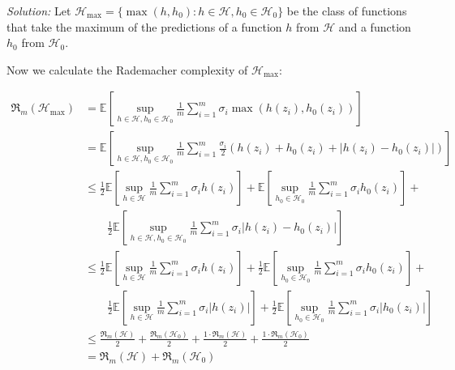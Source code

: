\documentclass[
	10pt, %
	a4paper, %
	oneside, %
	headinclude,footinclude, %
	BCOR5mm, %
]{scrartcl}
\newenvironment{solution}
{\textit{Solution:}}
{}
\begin{document}
\begin{solution}
	Let $\mathcal{H}_{\max} = \{\max(h, h_0 ): h \in \mathcal{H}, h_0 \in \mathcal{H_0} \}$ be the class of functions that take the maximum of the predictions of a function $h$ from $\mathcal{H}$ and a function $h_0$ from $\mathcal{H}_0$.

	Now we calculate the Rademacher complexity of $\mathcal{H}_{\max}$:

	\begin{align}
		\mathfrak{R}_m(\mathcal{H}_{\max}) & = \mathbb{E} \left[ \sup_{h\in\mathcal{H}, h_0\in\mathcal{H}_0} \frac{1}{m} \sum_{i=1}^m \sigma_i \max(h(z_i), h_0(z_i)) \right]                                                                                         \\
		                                   & = \mathbb{E} \left[ \sup_{h\in\mathcal{H}, h_0\in\mathcal{H}_0} \frac{1}{m} \sum_{i=1}^m \frac{\sigma_i}{2} (h(z_i) + h_0(z_i) + |h(z_i) - h_0(z_i)|) \right]                                                            \\
		                                   & \leq \frac{1}{2} \mathbb{E}\left[ \sup_{h\in\mathcal{H}}\frac{1}{m} \sum_{i=1}^m \sigma_i h(z_i)\right] + \mathbb{E}\left[\sup_{h_0\in\mathcal{H}_0}\frac{1}{m} \sum_{i=1}^m \sigma_i h_0(z_i)\right] +                  \\
		                                   & \qquad \frac{1}{2} \mathbb{E}\left[\sup_{h\in\mathcal{H}, h_0\in\mathcal{H}_0} \frac{1}{m} \sum_{i=1}^m \sigma_i |h(z_i) - h_0(z_i)|\right]                                                                              \\
		                                   & \leq \frac{1}{2} \mathbb{E}\left[ \sup_{h\in\mathcal{H}}\frac{1}{m} \sum_{i=1}^m \sigma_i h(z_i)\right] + \frac{1}{2}\mathbb{E}\left[\sup_{h_0\in\mathcal{H}_0}\frac{1}{m} \sum_{i=1}^m \sigma_i h_0(z_i)\right] +       \\
		                                   & \qquad \frac{1}{2} \mathbb{E}\left[\sup_{h\in\mathcal{H}} \frac{1}{m} \sum_{i=1}^m \sigma_i |h(z_i)|\right] + \frac{1}{2} \mathbb{E}\left[\sup_{h_0\in\mathcal{H}_0} \frac{1}{m} \sum_{i=1}^m \sigma_i |h_0(z_i)|\right] \\
		                                   & \leq \frac{\mathfrak{R}_m(\mathcal{H})}{2} + \frac{\mathfrak{R}_m(\mathcal{H}_0)}{2} + \frac{1 \cdot \mathfrak{R}_m(\mathcal{H})}{2} + \frac{1 \cdot \mathfrak{R}_m(\mathcal{H}_0)}{2}                                   \\
		                                   & = \mathfrak{R}_m(\mathcal{H}) + \mathfrak{R}_m(\mathcal{H}_0)
	\end{align}


\end{solution}
\end{document}
